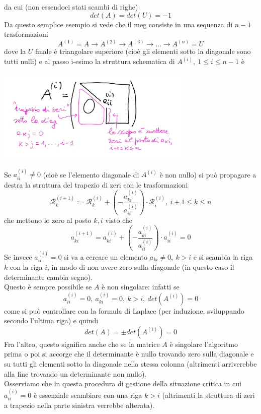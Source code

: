 \documentclass[12pt,a4paper]{article}
\begin{document}
da cui (non essendoci stati scambi di righe)
\begin{equation*}
    det(A) = det(U) = -1
\end{equation*}
Da questo semplice esempio si vede che il meg consiste in una sequenza di $n-1$ trasformazioni
\[
A^{(1)} = A \rightarrow A^{(2)} \rightarrow A^{(3)} \rightarrow \dotso \rightarrow A^{(n)} = U
\]
dove la $U$ finale è triangolare superiore (cioè gli elementi sotto la diagonale sono tutti nulli) e al passo i-esimo la struttura schematica di $A^{(i)}, \ 1 \le i \le n-1$ è
\begin{center}
    \includegraphics[width = 0.7\textwidth]{lez21_pag16.jpg}
\end{center}
Se $a_{ii}^{(i)} \neq 0$ (cioè se l'elemento diagonale di $A^{(i)}$ è non nullo) si può propagare a destra la struttura del trapezio di zeri con le trasformazioni
\[
\mathcal{R}_k^{(i+1)} := \mathcal{R}_k^{(i)} + \left(-\frac{a_{ki}^{(i)}}{a_{ii}^{(i)}}\right) \cdot \mathcal{R}_i^{(i)}, \ i+1 \le k \le n
\]
che mettono lo zero al posto $k,i$ visto che
\[
a_{ki}^{(i+1)} = a_{ki}^{(i)} + \left(-\frac{a_{ki}^{(i)}}{a_{ii}^{(i)}}\right) \cdot a_{ii}^{(i)} = 0
\]
Se invece $a_{ii}^{(i)} = 0$ si va a cercare un elemento $a_{ki} \neq 0, \ k > i$ e si scambia la riga $k$ con la riga $i$, in modo di non avere zero sulla diagonale (in questo caso il determinante cambia segno).\\
Questo è sempre possibile se $A$ è non singolare: infatti se
\[ a_{ii}^{(i)} = 0, \ a_{ki}^{(i)} = 0,\ k > i, \ det(A^{(i)}) = 0 \]
come si può controllare con la formula di Laplace (per induzione, sviluppando secondo l'ultima riga) e quindi
\[ det(A) = \pm det(A^{(i)}) = 0 \]
Fra l'altro, questo significa anche che se la matrice $A$ è singolare l'algoritmo prima o poi si accorge che il determinante è nullo trovando zero sulla diagonale e su tutti gli elementi sotto la diagonale nella stessa colonna (altrimenti arriverebbe alla fine trovando un determinante non nullo).\\
Osserviamo che in questa procedura di gestione della situazione critica in cui $a_{ii}^{(i)} = 0$ è essenziale scambiare con una riga $k > i$ (altrimenti la struttura di zeri a trapezio nella parte sinistra verrebbe alterata).\\
\end{document}
